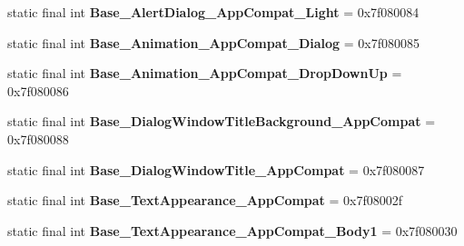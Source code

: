 \begin{DoxyCompactItemize}
\item 
\hypertarget{classandroid_1_1support_1_1v7_1_1appcompat_1_1_r_1_1style_aaa202e250d48237fff9225fa646ff72a}{}static final int {\bfseries Base\+\_\+\+Alert\+Dialog\+\_\+\+App\+Compat\+\_\+\+Light} = 0x7f080084\label{classandroid_1_1support_1_1v7_1_1appcompat_1_1_r_1_1style_aaa202e250d48237fff9225fa646ff72a}

\item 
\hypertarget{classandroid_1_1support_1_1v7_1_1appcompat_1_1_r_1_1style_abdb58c4283f54a5857e80fedf91b8e5f}{}static final int {\bfseries Base\+\_\+\+Animation\+\_\+\+App\+Compat\+\_\+\+Dialog} = 0x7f080085\label{classandroid_1_1support_1_1v7_1_1appcompat_1_1_r_1_1style_abdb58c4283f54a5857e80fedf91b8e5f}

\item 
\hypertarget{classandroid_1_1support_1_1v7_1_1appcompat_1_1_r_1_1style_a4aca380ad013eedfbbaff287c795f15f}{}static final int {\bfseries Base\+\_\+\+Animation\+\_\+\+App\+Compat\+\_\+\+Drop\+Down\+Up} = 0x7f080086\label{classandroid_1_1support_1_1v7_1_1appcompat_1_1_r_1_1style_a4aca380ad013eedfbbaff287c795f15f}

\item 
\hypertarget{classandroid_1_1support_1_1v7_1_1appcompat_1_1_r_1_1style_a7be1e72934eb4819115aa709d7f0557c}{}static final int {\bfseries Base\+\_\+\+Dialog\+Window\+Title\+Background\+\_\+\+App\+Compat} = 0x7f080088\label{classandroid_1_1support_1_1v7_1_1appcompat_1_1_r_1_1style_a7be1e72934eb4819115aa709d7f0557c}

\item 
\hypertarget{classandroid_1_1support_1_1v7_1_1appcompat_1_1_r_1_1style_abb6cb9ab09c33c7cd2c90e308f22f499}{}static final int {\bfseries Base\+\_\+\+Dialog\+Window\+Title\+\_\+\+App\+Compat} = 0x7f080087\label{classandroid_1_1support_1_1v7_1_1appcompat_1_1_r_1_1style_abb6cb9ab09c33c7cd2c90e308f22f499}

\item 
\hypertarget{classandroid_1_1support_1_1v7_1_1appcompat_1_1_r_1_1style_aafd21559a2cbd3a1242e39411a1c254c}{}static final int {\bfseries Base\+\_\+\+Text\+Appearance\+\_\+\+App\+Compat} = 0x7f08002f\label{classandroid_1_1support_1_1v7_1_1appcompat_1_1_r_1_1style_aafd21559a2cbd3a1242e39411a1c254c}

\item 
\hypertarget{classandroid_1_1support_1_1v7_1_1appcompat_1_1_r_1_1style_a00a15bd8d16faa2ae2a57b12caa194ed}{}static final int {\bfseries Base\+\_\+\+Text\+Appearance\+\_\+\+App\+Compat\+\_\+\+Body1} = 0x7f080030\label{classandroid_1_1support_1_1v7_1_1appcompat_1_1_r_1_1style_a00a15bd8d16faa2ae2a57b12caa194ed}


\end{DoxyCompactItemize}

